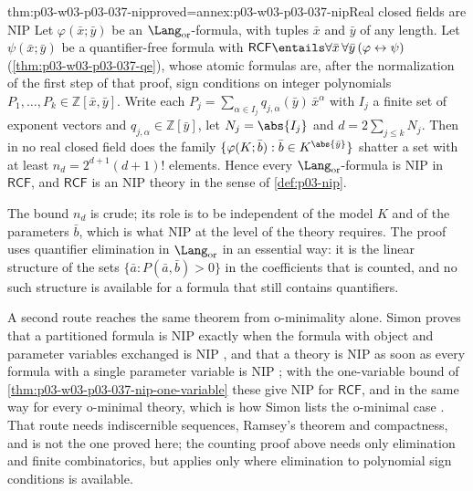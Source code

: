 \begin{hbtheorem}{thm:p03-w03-p03-037-nip}{proved=annex:p03-w03-p03-037-nip}{Real closed fields are NIP}
Let \(\varphi(\bar x;\bar y)\) be an \(\Lang_{\mathrm{or}}\)-formula, with
tuples \(\bar x\) and \(\bar y\) of any length.  Let \(\psi(\bar x;\bar y)\)
be a quantifier-free formula with
\(\mathsf{RCF}\entails\forall\bar x\,\forall\bar y\,(\varphi\leftrightarrow\psi)\)
(\cref{thm:p03-w03-p03-037-qe}), whose atomic formulas are, after the
normalization of the first step of that proof, sign conditions on integer
polynomials \(P_1,\dots,P_k\in\mathbb Z[\bar x,\bar y]\).  Write each
\(P_j=\sum_{\alpha\in I_j}q_{j,\alpha}(\bar y)\,\bar x^{\alpha}\) with
\(I_j\) a finite set of exponent vectors and
\(q_{j,\alpha}\in\mathbb Z[\bar y]\), let \(N_j=\abs{I_j}\) and
\(d=2\sum_{j\leq k}N_j\).  Then in no real closed field does the family
\(\{\varphi(K;\bar b):\bar b\in K^{\abs{\bar y}}\}\) shatter a set with at
least \(n_d=2^{d+1}(d+1)!\) elements.  Hence every
\(\Lang_{\mathrm{or}}\)-formula is NIP in \(\mathsf{RCF}\), and
\(\mathsf{RCF}\) is an NIP theory in the sense of \cref{def:p03-nip}.
\end{hbtheorem}

The bound \(n_d\) is crude; its role is to be independent of the model \(K\)
and of the parameters \(\bar b\), which is what NIP at the level of the theory
requires.  The proof uses quantifier elimination in \(\Lang_{\mathrm{or}}\) in
an essential way: it is the linear structure of the sets
\(\{\bar a:P(\bar a,\bar b)>0\}\) in the coefficients that is counted, and no
such structure is available for a formula that still contains quantifiers.

A second route reaches the same theorem from o-minimality alone.  Simon
proves that a partitioned formula is NIP exactly when the formula with object
and parameter variables exchanged is NIP
\cite[p.~14, Lemma~2.5]{Simon2015GuideManuscript}, and that a theory is NIP
as soon as every formula with a single parameter variable is NIP
\cite[p.~16, Proposition~2.11]{Simon2015GuideManuscript}; with the
one-variable bound of \cref{thm:p03-w03-p03-037-nip-one-variable} these give
NIP for \(\mathsf{RCF}\), and in the same way for every o-minimal theory,
which is how Simon lists the o-minimal case
\cite[p.~17, Example~2.12]{Simon2015GuideManuscript}.  That route needs
indiscernible sequences, Ramsey's theorem and compactness, and is not the one
proved here; the counting proof above needs only elimination and finite
combinatorics, but applies only where elimination to polynomial sign
conditions is available.

